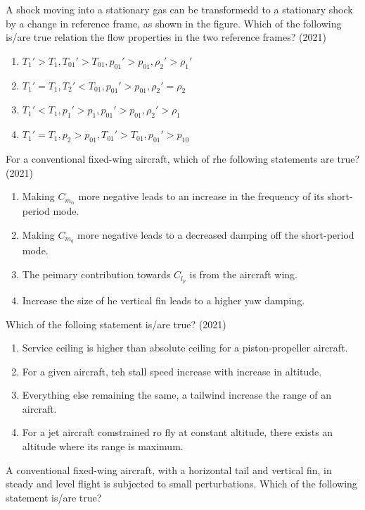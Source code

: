 	\item A shock moving into a stationary gas can be transformedd to a stationary shock by a change in reference frame, as shown in the figure. Which of the following is/are true relation the flow properties in the two  reference frames?
	\hfill{(2021)}

		\begin{enumerate}
             \item $T_1'>T_1,T_{01}'>T_{01},p_{01}'>p_{01},\rho_2'>\rho_1'$
             \item $T_1'=T_1,T_{2}'<T_{01},p_{01}'>p_{01},\rho_2'=\rho_2$
             \item $T_1'<T_1,p_{1}'>p_{1},p_{01}'>p_{01},\rho_2'>\rho_1$
             \item $T_1'=T_1,p_{2}>p_{01},T_{01}'>T_{01},p_{01}'>p_{10}$
         \end{enumerate}
	\item For a conventional fixed-wing aircraft, which of rhe following statements are true?
	\hfill{(2021)}
          \begin{enumerate}
              \item Making $C_{m_\alpha}$ more negative leads to an increase in the frequency of its short-period mode.
              \item Making $C_{m_q}$ more negative leads to a decreased damping off the short-period mode.
              \item The peimary contribution towards $C_{l_p}$ is from the aircraft wing.
              \item  Increase the size of he vertical fin leads to a higher yaw damping.
          \end{enumerate}
	\item Which of the folloing statement is/are true?
	\hfill{(2021)}
         \begin{enumerate}
             \item Service ceiling is higher than absolute ceiling for a piston-propeller aircraft.
             \item For a given aircraft, teh stall speed increase with increase in altitude.
             \item Everything else remaining the same, a tailwind increase the range of an aircraft.
             \item For a jet aircraft comstrained ro fly at constant altitude, there exists an altitude where its range is maximum.
         \end{enumerate}
	\item A conventional fixed-wing aircraft, with a horizontal tail and vertical fin, in steady and level flight is subjected to small perturbations. Which of the following statement is/are true?
